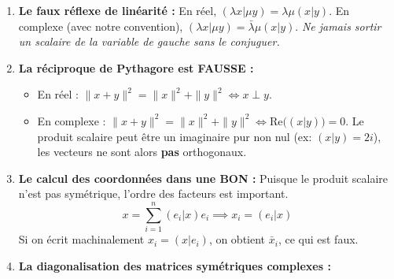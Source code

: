 \documentclass[french]{yLectureNote}
\begin{document}
\begin{enumerate}
    \item \textbf{Le faux réflexe de linéarité :}
    En réel, $(\lambda x | \mu y) = \lambda \mu (x|y)$. 
    En complexe (avec notre convention), $(\lambda x | \mu y) = \bar{\lambda} \mu (x|y)$. {\color{criticalColor} \textit{Ne jamais sortir un scalaire de la variable de gauche sans le conjuguer.}}
    
    \item \textbf{La réciproque de Pythagore est FAUSSE :}
    \begin{itemize}
        \item En réel : $\|x+y\|^2 = \|x\|^2 + \|y\|^2 \iff x \perp y$.
        \item En complexe : $\|x+y\|^2 = \|x\|^2 + \|y\|^2 \iff \text{Re}\big((x|y)\big) = 0$. Le produit scalaire peut être un imaginaire pur non nul (ex: $(x|y) = 2i$), les vecteurs ne sont alors \textbf{pas} orthogonaux.
    \end{itemize}

    \item \textbf{Le calcul des coordonnées dans une BON :}
    Puisque le produit scalaire n'est pas symétrique, l'ordre des facteurs est important.
    $$x = \sum_{i=1}^n (e_i|x)e_i \implies x_i = (e_i|x)$$
    Si on écrit machinalement $x_i = (x|e_i)$, on obtient $\bar{x}_i$, ce qui est faux.

    \item \textbf{La diagonalisation des matrices symétriques complexes :}
\end{enumerate}
\end{document}
